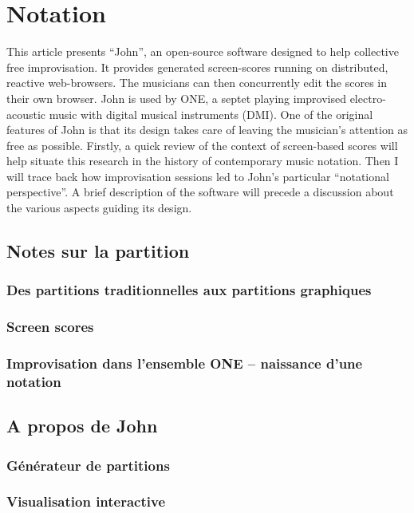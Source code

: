 %
\chapter{Notation}
\label{ch:notation}


This article presents “John”, an open-source software designed to help collective free improvisation. It provides generated screen-scores running on distributed, reactive web-browsers. The musicians can then concurrently edit the scores in their own browser. John is used by ONE, a septet playing improvised electro-acoustic music with digital musical instruments (DMI). One of the original features of John is that its design takes care of leaving the
musician's attention as free as possible.
Firstly, a quick review of the context of screen-based
scores will help situate this research in the history of contemporary music notation. Then I will trace back how improvisation sessions led to John's particular “notational perspective”. A brief description of the software will precede a discussion about the various aspects guiding its
design.


\section{Notes sur la partition}
\subsection{Des partitions traditionnelles aux partitions graphiques}
\subsection{Screen scores}
\subsection{Improvisation dans l'ensemble ONE – naissance d'une notation}

\section{A propos de John}
\subsection{Générateur de partitions}
\subsection{Visualisation interactive}
